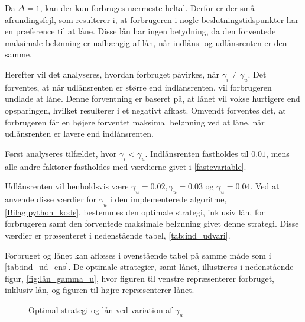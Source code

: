 
Da $\Delta = 1$, kan der kun forbruges nærmeste heltal. Derfor er der små afrundingsfejl, som resulterer i, at forbrugeren i nogle beslutningstidspunkter har en præference til at låne. Disse lån har ingen betydning, da den forventede maksimale belønning er uafhængig af lån, når indlåns- og udlånsrenten er den samme. 


Herefter vil det analyseres, hvordan forbruget påvirkes, når $\gamma_i \neq \gamma_u$. Det forventes, at når udlånsrenten er større end indlånsrenten, vil forbrugeren undlade at låne. 
Denne forventning er baseret på, at lånet vil vokse hurtigere end opsparingen, hvilket resulterer i et negativt afkast. Omvendt forventes det, at forbrugeren får en højere forventet maksimal belønning ved at låne, når udlånsrenten er lavere end indlånsrenten.

Først analyseres tilfældet, hvor $\gamma_i < \gamma_u$. Indlånsrenten fastholdes til $0.01$, mens alle andre faktorer fastholdes med værdierne givet i \eqref{fastevariable}.

Udlånsrenten vil henholdsvis være $\gamma_u = 0.02, \gamma_u = 0.03$ og $\gamma_u = 0.04$. Ved at anvende disse værdier for $\gamma_u$ i den implementerede algoritme, \autoref{Bilag:python_kode}, bestemmes den optimale strategi, inklusiv lån, for forbrugeren samt den forventede maksimale belønning givet denne strategi. Disse værdier er præsenteret i nedenstående tabel, \autoref{tab:ind_udvari}.


Forbruget og lånet kan aflæses i ovenstående tabel på samme måde som i \autoref{tab:ind_ud_ens}. 
De optimale strategier, samt lånet, illustreres i nedenstående figur, \autoref{fig:lån_gamma_u}, hvor figuren til venstre repræsenterer forbruget, inklusiv lån, og figuren til højre repræsenterer lånet. 
%
% 
\begin{figure}[H]
    \begin{center}
        \resizebox{8cm}{!}{}
        \resizebox{8cm}{!}{}
    \end{center}
    \caption{Optimal strategi og lån ved variation af $\gamma_u$}\label{fig:lån_gamma_u}
\end{figure}

